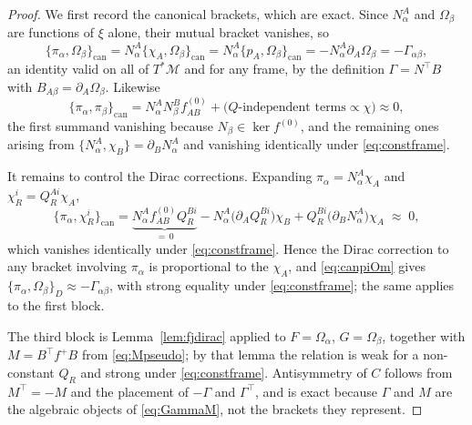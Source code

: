 \documentclass[12pt]{article}
\theoremstyle{plain}
\theoremstyle{definition}
\theoremstyle{remark}
\newcommand{\pd}[1]{\partial_{#1}}
\newcommand{\Om}{\Omega}
\newcommand{\Mm}{\mathcal{M}}
\begin{document}
	\begin{proof}
		We first record the canonical brackets, which are exact. Since $N_{\alpha}^{A}$
		and $\Om_{\beta}$ are functions of $\xi$ alone, their mutual bracket vanishes,
		so
		\begin{equation}
			\{\pi_{\alpha},\Om_{\beta}\}_{\mathrm{can}}
			=N_{\alpha}^{A}\{\chi_{A},\Om_{\beta}\}_{\mathrm{can}}
			=N_{\alpha}^{A}\{p_{A},\Om_{\beta}\}_{\mathrm{can}}
			=-N_{\alpha}^{A}\pd{A}\Om_{\beta}
			=-\Gamma_{\alpha\beta},
			\label{eq:canpiOm}
		\end{equation}
		an identity valid on all of $T^{*}\Mm$ and for any frame, by the definition
		$\Gamma=N^{\top}B$ with $B_{A\beta}=\pd{A}\Om_{\beta}$. Likewise
		\[
		\{\pi_{\alpha},\pi_{\beta}\}_{\mathrm{can}}
		=N_{\alpha}^{A}N_{\beta}^{B}f^{(0)}_{AB}
		+\bigl(Q\text{-independent terms}\propto\chi\bigr)
		\approx0,
		\]
		the first summand vanishing because $N_{\beta}\in\ker f^{(0)}$, and the
		remaining ones arising from $\{N_{\alpha}^{A},\chi_{B}\}=\pd{B}N_{\alpha}^{A}$
		and vanishing identically under \eqref{eq:constframe}.
		
		It remains to control the Dirac corrections. Expanding
		$\pi_{\alpha}=N_{\alpha}^{A}\chi_{A}$ and $\chi_{R}^{i}=Q_{R}^{Ai}\chi_{A}$,
		\begin{equation}
			\{\pi_{\alpha},\chi_{R}^{i}\}_{\mathrm{can}}
			=\underbrace{N_{\alpha}^{A}f^{(0)}_{AB}Q_{R}^{Bi}}_{=\,0}
			-N_{\alpha}^{A}\bigl(\pd{A}Q_{R}^{Bi}\bigr)\chi_{B}
			+Q_{R}^{Bi}\bigl(\pd{B}N_{\alpha}^{A}\bigr)\chi_{A}
			\;\approx\;0 ,
			\label{eq:pichiR}
		\end{equation}
		which vanishes identically under \eqref{eq:constframe}. Hence the Dirac
		correction to any bracket involving $\pi_{\alpha}$ is proportional to the
		$\chi_{A}$, and \eqref{eq:canpiOm} gives
		$\{\pi_{\alpha},\Om_{\beta}\}_{D}\approx-\Gamma_{\alpha\beta}$, with strong
		equality under \eqref{eq:constframe}; the same applies to the first block.
		
		The third block is Lemma~\ref{lem:fjdirac} applied to $F=\Om_{\alpha}$,
		$G=\Om_{\beta}$, together with $M=B^{\top}f^{+}B$ from \eqref{eq:Mpseudo}; by
		that lemma the relation is weak for a non-constant $Q_{R}$ and strong under
		\eqref{eq:constframe}. Antisymmetry of $C$ follows from $M^{\top}=-M$ and the
		placement of $-\Gamma$ and $\Gamma^{\top}$, and is exact because $\Gamma$ and
		$M$ are the algebraic objects of \eqref{eq:GammaM}, not the brackets they
		represent.
	\end{proof}
	
\end{document}
